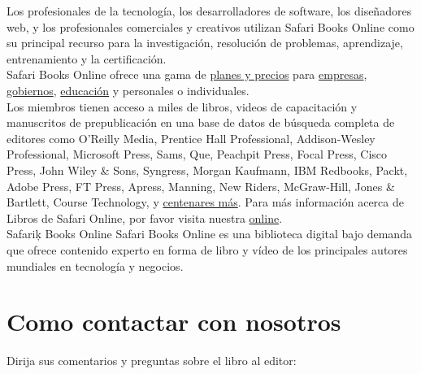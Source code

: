 


Los profesionales de la tecnología, los desarrolladores de software, los diseñadores web, y los profesionales comerciales y creativos utilizan Safari Books Online como su principal recurso para la investigación, resolución de problemas, aprendizaje, entrenamiento y  la certificación.\\



Safari Books Online ofrece una gama de  \href{https://www.safaribooksonline.com/pricing/}{\color{vino} planes y precios}  para  \href{https://www.safaribooksonline.com/enterprise/}{\color{vino} empresas},  
\href{https://www.safaribooksonline.com/government/}{\color{vino} gobiernos},  \href{https://www.safaribooksonline.com/academic-public-library/ }{\color{vino} educación}  y personales o individuales.\\


Los miembros tienen acceso a miles de libros, videos de capacitación y manuscritos de prepublicación en una base de datos de búsqueda completa de editores como   O’Reilly Media, Prentice Hall Professional, Addison-Wesley Professional, Microsoft Press, Sams, Que, Peachpit Press, Focal Press, Cisco Press, John Wiley \& Sons, Syngress, Morgan Kaufmann, IBM Redbooks, Packt, Adobe Press, FT Press, Apress, Manning, New Riders,
McGraw-Hill, Jones \& Bartlett, Course Technology,  y \href{https://www.oreilly.com/our-library/}{\color{vino} centenares más}. Para más información acerca de Libros de Safari Online, por favor visita nuestra  \href{https://www.oreilly.com/}{\color{vino} online}.\\




Safariķ Books Online Safari Books Online es una biblioteca digital bajo demanda que ofrece contenido experto en forma de libro y vídeo de los principales autores mundiales en tecnología y negocios.






\section*{Como contactar con nosotros}


Dirija sus comentarios y preguntas sobre el libro al editor:\\


